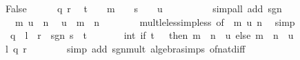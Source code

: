 \begin{isabellebody}
\ False\isanewline
\ \ \ \ \isamarkupfalse%
\ q\ r\ \isamarkupfalse%
\ {\isachardoublequoteopen}t\ {\isasymnoteq}\ {}{\isachardoublequoteclose}\ \ {\isachardoublequoteopen}m\ {\isachargreater}{\kern0pt}\ {}{\isachardoublequoteclose}\ \ {\isachardoublequoteopen}s\ {\isasymnoteq}\ {}{\isachardoublequoteclose}\ \ {\isachardoublequoteopen}u\ {\isachargreater}{\kern0pt}\ {}{\isachardoublequoteclose}\isanewline
\ \ \ \ \ \ \isamarkupfalse%
\ {\isacharparenleft}{\kern0pt}simp{\isacharunderscore}{\kern0pt}all\ add{\isacharcolon}{\kern0pt}\ sgn{\isacharunderscore}{\kern0pt}{}{\isacharunderscore}{\kern0pt}{}{\isacharparenright}{\kern0pt}\isanewline
\ \ \ \ \isamarkupfalse%
\ \isamarkupfalse%
\ {\isacartoucheopen}{}\ {\isacharless}{\kern0pt}\ m{\isacartoucheclose}\ {\isacartoucheopen}u\ {\isacharless}{\kern0pt}\ n{\isacartoucheclose}\ \isamarkupfalse%
\ {\isachardoublequoteopen}u\ {\isasymle}\ m\ {\isacharasterisk}{\kern0pt}\ n{\isachardoublequoteclose}\isanewline
\ \ \ \ \ \ \isamarkupfalse%
\ mult{\isacharunderscore}{\kern0pt}le{\isacharunderscore}{\kern0pt}less{\isacharunderscore}{\kern0pt}imp{\isacharunderscore}{\kern0pt}less\ {\isacharbrackleft}{\kern0pt}of\ {}\ m\ u\ n{\isacharbrackright}{\kern0pt}\ \isamarkupfalse%
\ simp\isanewline
\ \ \ \ \isamarkupfalse%
\ \isamarkupfalse%
\ {\isacharasterisk}{\kern0pt}{\isacharcolon}{\kern0pt}\ {\isachardoublequoteopen}q\ {\isacharasterisk}{\kern0pt}\ l\ {\isacharplus}{\kern0pt}\ r\ {\isacharequal}{\kern0pt}\ sgn\ {\isacharparenleft}{\kern0pt}s\ {\isacharasterisk}{\kern0pt}\ t{\isacharparenright}{\kern0pt}\isanewline
\ \ \ \ \ \ {\isacharasterisk}{\kern0pt}\ int\ {\isacharparenleft}{\kern0pt}if\ t\ {\isacharless}{\kern0pt}\ {}\ then\ m\ {\isacharasterisk}{\kern0pt}\ n\ {\isacharminus}{\kern0pt}\ u\ else\ m\ {\isacharasterisk}{\kern0pt}\ n\ {\isacharplus}{\kern0pt}\ u{\isacharparenright}{\kern0pt}{\isachardoublequoteclose}\isanewline
\ \ \ \ \ \ \isamarkupfalse%
\ l\ q\ r\isanewline
\ \ \ \ \ \ \isamarkupfalse%
\ {\isacharparenleft}{\kern0pt}simp\ add{\isacharcolon}{\kern0pt}\ sgn{\isacharunderscore}{\kern0pt}mult\ algebra{\isacharunderscore}{\kern0pt}simps\ of{\isacharunderscore}{\kern0pt}nat{\isacharunderscore}{\kern0pt}diff{\isacharparenright}{\kern0pt}\isanewline

\end{isabellebody}
